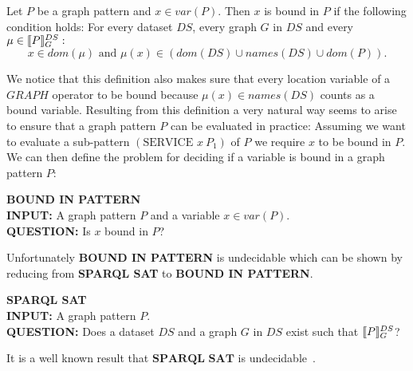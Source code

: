 \begin{definition}
Let $P$ be a graph pattern and $x \in var(P)$. Then $x$ is bound in $P$ if the
following condition holds:
For every dataset $DS$, every graph $G$ in $DS$ 
and every $\mu \in \llbracket P \rrbracket^{DS}_G:$\\
\[ x \in dom(\mu) \mbox{ and } \mu(x) \in (dom(DS) \cup names(DS) \cup dom(P)). \]
\end{definition}

\noindent We notice that this definition also makes sure that every location 
variable of a $GRAPH$
operator to be bound because $\mu(x) \in names(DS)$ counts as a bound variable.
Resulting from this definition a very natural way seems to arise to ensure that
a graph pattern $P$ can be evaluated in practice: 
Assuming we want to evaluate a sub-pattern $(\mbox{SERVICE } x \ P_1)$ of $P$
we require $x$ to be bound in $P$. We can then define the problem for deciding if a variable
is bound in a graph pattern $P$:

\begin{framed}\noindent \textbf{BOUND IN PATTERN}\\
	\textbf{INPUT:} A graph pattern $P$ and a variable $x \in var(P)$.\\
	\textbf{QUESTION:} Is $x$ bound in $P$?
\end{framed}
Unfortunately \textbf{BOUND IN PATTERN} is undecidable which can be shown by
reducing from \textbf{SPARQL SAT} to \textbf{BOUND IN PATTERN}.
\begin{framed}\noindent \textbf{SPARQL SAT}\\
	\textbf{INPUT:} A graph pattern $P$.\\
	\textbf{QUESTION:} Does a dataset $DS$ and a graph $G$ in $DS$ exist such
	that $\llbracket P \rrbracket^{DS}_G$?
\end{framed}
It is a well known result that $\textbf{SPARQL SAT}$ is undecidable~\cite{angles2008expressive}.

